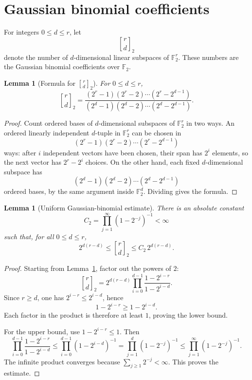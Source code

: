 \documentclass[a4paper,11pt]{amsart}
\newtheorem{lemma}[theorem]{Lemma}
\theoremstyle{remark}
\newcommand{\F}{\mathbb F}
\newcommand{\gbinom}[2]{\genfrac{[}{]}{0pt}{}{#1}{#2}_2}
\begin{document}
\section{Gaussian binomial coefficients}

For integers \(0\leq d\leq r\), let
\[
        \gbinom{r}{d}
\]
denote the number of \(d\)-dimensional linear subspaces of \(\F_2^r\). These numbers are the
Gaussian binomial coefficients over \(\F_2\).

\begin{lemma}[Formula for \(\gbinom{r}{d}\)]\label{lem:gauss-formula}
For \(0\leq d\leq r\),
\[
        \gbinom{r}{d}
        =
        \frac{(2^r-1)(2^r-2)\cdots(2^r-2^{d-1})}
        {(2^d-1)(2^d-2)\cdots(2^d-2^{d-1})}.
\]
\end{lemma}

\begin{proof}
Count ordered bases of \(d\)-dimensional subspaces of \(\F_2^r\) in two ways. An ordered
linearly independent \(d\)-tuple in \(\F_2^r\) can be chosen in
\[
        (2^r-1)(2^r-2)\cdots(2^r-2^{d-1})
\]
ways: after \(i\) independent vectors have been chosen, their span has \(2^i\) elements, so the
next vector has \(2^r-2^i\) choices. On the other hand, each fixed \(d\)-dimensional subspace has
\[
        (2^d-1)(2^d-2)\cdots(2^d-2^{d-1})
\]
ordered bases, by the same argument inside \(\F_2^d\). Dividing gives the formula.
\end{proof}

\begin{lemma}[Uniform Gaussian-binomial estimate]\label{lem:gauss-estimate}
There is an absolute constant
\[
        C_2=\prod_{j=1}^{\infty}(1-2^{-j})^{-1}<\infty
\]
such that, for all \(0\leq d\leq r\),
\[
        2^{d(r-d)}\leq \gbinom{r}{d}\leq C_2\,2^{d(r-d)}.
\]
\end{lemma}

\begin{proof}
Starting from Lemma~\ref{lem:gauss-formula}, factor out the powers of \(2\):
\[
        \gbinom{r}{d}
        =2^{d(r-d)}
        \prod_{i=0}^{d-1}\frac{1-2^{i-r}}{1-2^{i-d}}.
\]
Since \(r\geq d\), one has \(2^{i-r}\leq 2^{i-d}\), hence
\[
        1-2^{i-r}\geq 1-2^{i-d}.
\]
Each factor in the product is therefore at least \(1\), proving the lower bound.

For the upper bound, use \(1-2^{i-r}\leq 1\). Then
\[
        \prod_{i=0}^{d-1}\frac{1-2^{i-r}}{1-2^{i-d}}
        \leq
        \prod_{i=0}^{d-1}(1-2^{i-d})^{-1}
        =
        \prod_{j=1}^{d}(1-2^{-j})^{-1}
        \leq
        \prod_{j=1}^{\infty}(1-2^{-j})^{-1}.
\]
The infinite product converges because \(\sum_{j\geq 1}2^{-j}<\infty\). This proves the estimate.
\end{proof}
\end{document}
